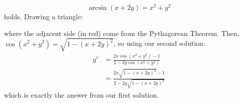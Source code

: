 \begin{solution}
\begin{itemize}
\[\arcsin(x+2y)=x^2+y^2\]
holds. Drawing a triangle:
\begin{center}\end{center}
where the adjacent side (in red) come from the Pythagorean Theorem. Then,
$\cos(x^2+y^2)=\sqrt{1-(x+2y)^2}$, so using our second solution:
\begin{align*}
y'&=\frac{2x\cos(x^2+y^2)-1}{2-2y\cos(x^2+y^2)}\\
&=\frac{2x\sqrt{1-(x+2y)^2}-1}{2-2y\sqrt{1-(x+2y)^2}}
\end{align*}
which is exactly the answer from our first solution.
\end{itemize}
\end{solution}
